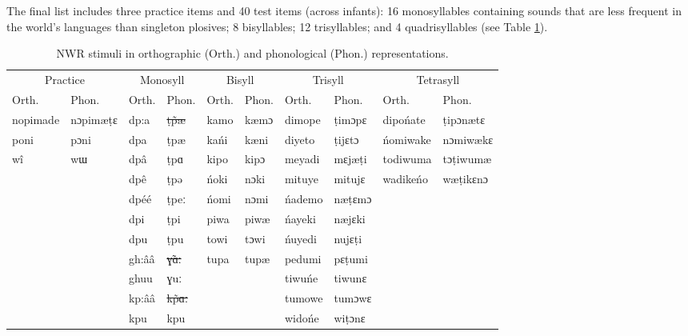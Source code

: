 \documentclass[ %
american, %
,man,floatsintext]{apa6} %
\providecommand{\DIFaddtex}[1]{{\protect\color{blue}\uwave{#1}}} %
\providecommand{\DIFdeltex}[1]{{\protect\color{red}\sout{#1}}}                      %
\providecommand{\DIFdelbegin}{} %
\providecommand{\DIFaddFL}[1]{\DIFadd{#1}} %
\providecommand{\DIFdelFL}[1]{\DIFdel{#1}} %
\providecommand{\DIFaddbeginFL}{} %
\providecommand{\DIFaddendFL}{} %
\providecommand{\DIFdelbeginFL}{} %
\providecommand{\DIFdelendFL}{} %
\providecommand{\DIFadd}[1]{\texorpdfstring{\DIFaddtex{#1}}{#1}} %
\providecommand{\DIFdel}[1]{\texorpdfstring{\DIFdeltex{#1}}{}} %
\newcommand{\DIFscaledelfig}{0.5}
\newlength{\DIFdelgraphicswidth} %
\newlength{\DIFdelgraphicsheight} %
\newcommand{\DIFaddincludegraphics}[2][]{{\color{blue}\fbox{\DIFOincludegraphics[#1]{#2}}}} %
\newcommand{\DIFdelincludegraphics}[2][]{%
	\sbox{\DIFdelgraphicsbox}{\DIFOincludegraphics[#1]{#2}}%
	\settoboxwidth{\DIFdelgraphicswidth}{\DIFdelgraphicsbox} %
	\settoboxtotalheight{\DIFdelgraphicsheight}{\DIFdelgraphicsbox} %
	\scalebox{\DIFscaledelfig}{%
		\parbox[b]{\DIFdelgraphicswidth}{\usebox{\DIFdelgraphicsbox}\\[-\baselineskip] \rule{\DIFdelgraphicswidth}{0em}}\llap{\resizebox{\DIFdelgraphicswidth}{\DIFdelgraphicsheight}{%
				\setlength{\unitlength}{\DIFdelgraphicswidth}%
				\begin{picture}(1,1)%
				\thicklines\linethickness{2pt} %
				{\color[rgb]{1,0,0}\put(0,0){\framebox(1,1){}}}%
				{\color[rgb]{1,0,0}\put(0,0){\line( 1,1){1}}}%
				{\color[rgb]{1,0,0}\put(0,1){\line(1,-1){1}}}%
				\end{picture}%
			}\hspace*{3pt}}} %
} %
\DeclareRobustCommand{\DIFdelbegin}{\DIFOdelbegin \let\includegraphics\DIFdelincludegraphics} %
\DeclareRobustCommand{\DIFaddbeginFL}{\DIFOaddbeginFL \let\includegraphics\DIFaddincludegraphics} %
\DeclareRobustCommand{\DIFaddendFL}{\DIFOaddendFL \let\includegraphics\DIFOincludegraphics} %
\DeclareRobustCommand{\DIFdelbeginFL}{\DIFOdelbeginFL \let\includegraphics\DIFdelincludegraphics} %
\DeclareRobustCommand{\DIFdelendFL}{\DIFOaddendFL \let\includegraphics\DIFOincludegraphics} %
\begin{document}
The final list includes three practice items and 40 test items (across infants): 16 monosyllables containing sounds that are less frequent in the world's languages than singleton plosives; 8 bisyllables; 12 trisyllables; and 4 quadrisyllables (see Table \ref{tab:tabstims}).

\DIFdelbegin %
\DIFdelendFL \DIFaddbeginFL \begin{table}[H]
	\DIFaddendFL 
	
	\caption{\label{tab:tabstims}NWR stimuli in orthographic (Orth.) and phonological (Phon.) representations.}
	\centering
	\begin{tabular}[t]{llllllllll}
		\toprule
		\multicolumn{2}{c}{Practice} & \multicolumn{2}{c}{Monosyll} & \multicolumn{2}{c}{Bisyll} & \multicolumn{2}{c}{Trisyll} & \multicolumn{2}{c}{Tetrasyll} \\
		\cmidrule(l{3pt}r{3pt}){1-2} \cmidrule(l{3pt}r{3pt}){3-4} \cmidrule(l{3pt}r{3pt}){5-6} \cmidrule(l{3pt}r{3pt}){7-8} \cmidrule(l{3pt}r{3pt}){9-10}
		Orth. & Phon. & Orth. & Phon. & Orth. & Phon. & Orth. & Phon. & Orth. & Phon.\\
		\midrule
		nopimade & nɔpimæṭɛ & dp:a & \DIFdelbeginFL \DIFdelFL{ṭp̃æ }\DIFdelendFL \DIFaddbeginFL \DIFaddFL{ṭpæ̃ }\DIFaddendFL & kamo & kæmɔ & dimope & ṭimɔpɛ & dipońate & ṭipɔnætɛ\\
		poni & pɔni & dpa & ṭpæ & kańi & kæni & diyeto & ṭijɛtɔ & ńomiwake & nɔmiwækɛ\\
		wî & wɯ & dpâ & ṭpɑ & kipo & kipɔ & meyadi & mɛjæṭi & todiwuma & tɔṭiwumæ\\
		&  & dpê & ṭpə & ńoki & nɔki & mituye & mitujɛ & wadikeńo & wæṭikɛnɔ\\
		&  & dpéé & ṭpeː & ńomi & nɔmi & ńademo & næṭɛmɔ &  & \\
		\addlinespace
		&  & dpi & ṭpi & piwa & piwæ & ńayeki & næjɛki &  & \\
		&  & dpu & ṭpu & towi & tɔwi & ńuyedi & nujɛṭi &  & \\
		&  & gh:ââ & \DIFdelbeginFL \DIFdelFL{ɣ̃ɑː }\DIFdelendFL \DIFaddbeginFL \DIFaddFL{ɣɑ̃ː }\DIFaddendFL & tupa & tupæ & pedumi & pɛṭumi &  & \\
		&  & ghuu & ɣuː &  &  & tiwuńe & tiwunɛ &  & \\
		&  & kp:ââ & \DIFdelbeginFL \DIFdelFL{kp̃ɑː }\DIFdelendFL \DIFaddbeginFL \DIFaddFL{kpɑ̃ː }\DIFaddendFL &  &  & tumowe & tumɔwɛ &  & \\
		\addlinespace
		&  & kpu & kpu &  &  & widońe & wiṭɔnɛ &  & \\

\end{tabular}
\end{table}
\end{document}
